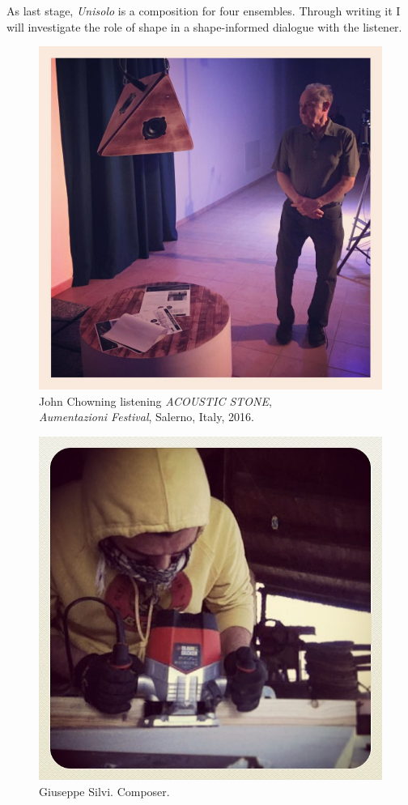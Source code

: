 \documentclass[
	a4paper,
	twocolumn
	]{article}
\begin{document}
As last stage, \emph{Unisolo} is a composition for four ensembles. Through writing it I will investigate the role of shape in a shape-informed dialogue with the listener.

\raggedright



\vfill\null

\newpage


\begin{figure}[htbp]
\begin{center}
\includegraphics[width=.47\textwidth]{img/14597413_1128159647252783_1502048594255937536_n.jpg}
\caption{John Chowning listening \emph{ACOUSTIC STONE}, \\ \emph{Aumentazioni Festival}, Salerno, Italy, 2016.}
\label{chowning}
\end{center}
\end{figure}

\begin{figure}[htbp]
\centering
\includegraphics[width=.47\textwidth]{img/927576_1422938657945799_34474354_n}
\caption{Giuseppe Silvi. Composer.}
\label{composer}
\end{figure}

~

\vfill\null
\end{document}
